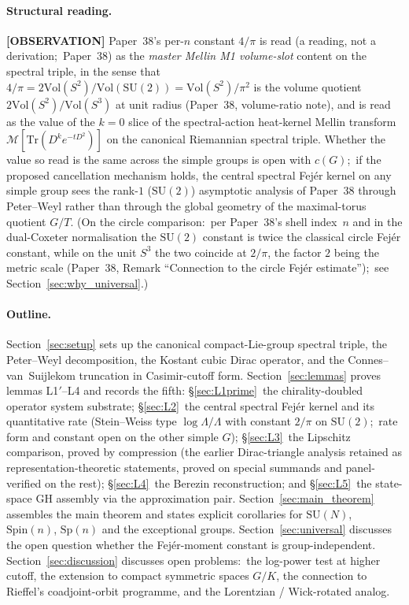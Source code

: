 \documentclass[11pt,a4paper]{article}
\theoremstyle{plain}
\theoremstyle{definition}
\newcommand{\Lammax}{\Lambda}
\newcommand{\SU}{\mathrm{SU}}
\newcommand{\Spin}{\mathrm{Spin}}
\newcommand{\Sp}{\mathrm{Sp}}
\newcommand{\Vol}{\mathrm{Vol}}
\newcommand{\Tr}{\mathrm{Tr}}
\begin{document}
\paragraph{Structural reading.}
\textbf{[OBSERVATION]} Paper~38's per-$n$ constant $4/\pi$ is read (a reading, not a
derivation;\ Paper~38) as the \emph{master Mellin M1 volume-slot} content
on the spectral triple, in the sense that
$4/\pi = 2\Vol(S^2)/\Vol(\SU(2)) = \Vol(S^2)/\pi^2$ is the
volume quotient $2\Vol(S^2)/\Vol(S^3)$ at unit radius (Paper~38, volume-ratio note), and
is read as the value of the
$k = 0$ slice of the spectral-action heat-kernel Mellin transform
$\mathcal M[\Tr(D^k e^{-tD^2})]$ on the canonical Riemannian spectral
triple. Whether the value so read is the same across the simple groups
is open with $c(G)$;\ if the proposed cancellation mechanism holds, the
central spectral Fej\'er kernel on any simple group sees the
rank-$1$ ($\SU(2)$) asymptotic analysis of Paper~38 through
Peter--Weyl rather than through the global geometry of the
maximal-torus quotient $G/T$. (On the circle comparison:\ per Paper~38's shell index~$n$ and in the dual-Coxeter normalisation the $\SU(2)$ constant is twice the
classical circle Fej\'er constant, while on the unit $S^3$ the two
coincide at $2/\pi$, the factor $2$ being the metric scale (Paper~38, Remark
``Connection to the circle Fej\'er estimate'');\ see Section~\ref{sec:why_universal}.)

\paragraph{Outline.}
Section~\ref{sec:setup} sets up the canonical compact-Lie-group
spectral triple, the Peter--Weyl decomposition, the Kostant cubic
Dirac operator, and the Connes--van~Suijlekom truncation in
Casimir-cutoff form. Section~\ref{sec:lemmas} proves lemmas L1$'$--L4
and records the fifth:
\S\ref{sec:L1prime}~the chirality-doubled operator system substrate;
\S\ref{sec:L2}~the central spectral Fej\'er kernel and its quantitative
rate (Stein--Weiss type $\log \Lammax / \Lammax$ with constant $2/\pi$
on $\SU(2)$;\ rate form and constant open on the other simple $G$); \S\ref{sec:L3}~the Lipschitz comparison, proved by compression (the
earlier Dirac-triangle analysis retained as representation-theoretic
statements, proved on special summands and panel-verified on the rest);
\S\ref{sec:L4}~the Berezin reconstruction; and \S\ref{sec:L5}~the
state-space GH assembly via the approximation pair. Section~\ref{sec:main_theorem}
assembles the main theorem and states explicit corollaries for
$\SU(N)$, $\Spin(n)$, $\Sp(n)$ and the exceptional groups.
Section~\ref{sec:universal} discusses the open question whether the
Fej\'er-moment constant is group-independent. Section~\ref{sec:discussion} discusses
open problems:\ the log-power test at higher cutoff, the extension to
compact symmetric spaces $G/K$, the connection to Rieffel's
coadjoint-orbit programme, and the Lorentzian / Wick-rotated analog.
\end{document}
